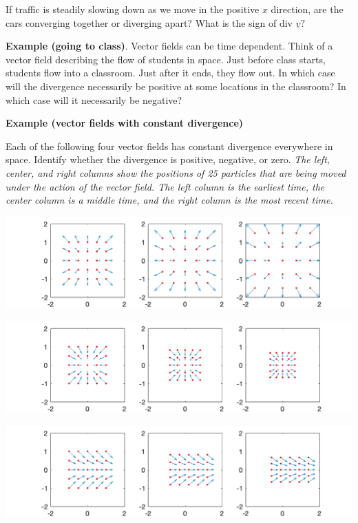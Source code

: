 \documentclass[12pt,letterpaper,noanswers]{exam}
\newcommand{\mb}[1]{\underline{#1}}
\begin{document}
If traffic is steadily slowing down as we move in the positive $x$ direction, are the cars converging together or diverging apart?  What is the sign of $\text{div }\mb v?$


\vspace{1in}

\noindent\textbf{Example (going to class)}.  Vector fields can be time dependent.  Think of a vector field describing the flow of students in space.  Just before class starts, students flow into a classroom.  Just after it ends, they flow out.  In which case will the divergence necessarily be positive at some locations in the classroom?  In which case will it necessarily be negative?

\vspace{1in}

\noindent\textbf{Example (vector fields with constant divergence)}

Each of the following four vector fields has constant divergence everywhere in space.  Identify whether the divergence is positive, negative, or zero.  \emph{The left, center, and right columns show the positions of 25 particles that are being moved under the action of the vector field.  The left column is the earliest time, the center column is a middle time, and the right column is the most recent time.}

\includegraphics[width=0.9\linewidth]{img/C26p1a.png}

\includegraphics[width=0.9\linewidth]{img/C26p1b.png}

\includegraphics[width=0.9\linewidth]{img/C26p1c.png}
\end{document}
